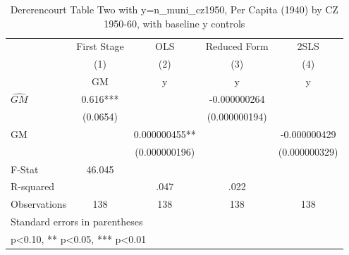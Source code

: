 \begin{table}[htbp]\centering
\def\sym#1{\ifmmode^{#1}\else\(^{#1}\)\fi}
\caption{Dererencourt Table Two with y=n\_muni\_cz1950, Per Capita (1940) by CZ 1950-60, with baseline y controls}
\begin{tabular}{l*{4}{c}}
\toprule
                    & First Stage   &         OLS   &Reduced Form   &        2SLS   \\
                    &\multicolumn{1}{c}{(1)}&\multicolumn{1}{c}{(2)}&\multicolumn{1}{c}{(3)}&\multicolumn{1}{c}{(4)}\\
                    &\multicolumn{1}{c}{GM}&\multicolumn{1}{c}{y}&\multicolumn{1}{c}{y}&\multicolumn{1}{c}{y}\\
\midrule
$\hat{GM}$          &       0.616***&               &-0.000000264   &               \\
                    &    (0.0654)   &               &(0.000000194)   &               \\
\addlinespace
GM                  &               & 0.000000455** &               &-0.000000429   \\
                    &               &(0.000000196)   &               &(0.000000329)   \\
\midrule
F-Stat              &      46.045   &               &               &               \\
R-squared           &               &        .047   &        .022   &               \\
Observations        &         138   &         138   &         138   &         138   \\
\bottomrule
\multicolumn{5}{l}{\footnotesize Standard errors in parentheses}\\
\multicolumn{5}{l}{\footnotesize * p<0.10, ** p<0.05, *** p<0.01}\\
\end{tabular}
\end{table}
